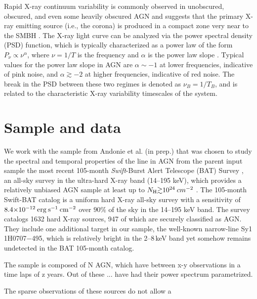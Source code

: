 Rapid X-ray continuum variability is commonly observed in unobscured, obscured, and even some heavily obscured AGN and suggests that the primary X-ray emitting source (i.e., the corona) is produced in a compact zone very near to the SMBH \citep[e.g.,][]{1993ARA&A..31..717M, 2013MNRAS.431.2441D}. The X-ray light curve can be analyzed via the power spectral density (PSD) function, which is typically characterized as a power law of the form $P_{\nu} \propto \nu ^{\alpha}$, where $\nu = 1/T$ is the frequency and $\alpha$ is the power law slope \citep[e.g.,][]{1993MNRAS.265..664G, 1999ApJ...514..682E, 2003MNRAS.339.1237V}. Typical values for the power law slope in AGN are $\alpha{\sim}{-}1$ at lower frequencies, indicative of pink noise, and $\alpha\gtrsim-2$ at higher frequencies, indicative of red noise. The break in the PSD between these two regimes is denoted as $\nu_B = 1/T_B$, and is related to the characteristic X-ray variability timescales of the system. 

\section{Sample and data}
We work with the sample from Andonie et al. (in prep.) that was chosen to study the spectral and temporal properties of the \kalfa{} line in AGN from the 
parent input sample the most recent 105-month \textit{Swift}-Burst Alert Telescope (BAT) Survey \citep{2018ApJS..235....4O}, an all-sky survey in the ultra-hard X-ray band (14--195 keV), which provides a relatively unbiased AGN sample at least up to $N_{\rm H}{\gtrsim}10^{24}\:cm^{-2}$ \citep{2015ApJ...815L..13R}. The 105-month Swift-BAT catalog is a uniform hard X-ray all-sky survey with a sensitivity of $8.4 {\times} 10^{-12}\: {\rm erg\:s^{-1}\:cm^{-2}}$ over $90\%$ of the sky in the 14–195 keV band. The survey catalogs 1632 hard X-ray sources, 947 of which are securely classified as AGN. They include one additional target in our sample, the well-known narrow-line Sy1 1H0707$-$495, which is relatively bright in the 2--8\,keV band yet somehow remains undetected in the BAT 105-month catalog.

The sample is composed of N AGN, which have between x-y observations in a time laps of z years. Out of these ... have had their power spectrum parametrized.

The sparse observations of these sources do not allow a 

